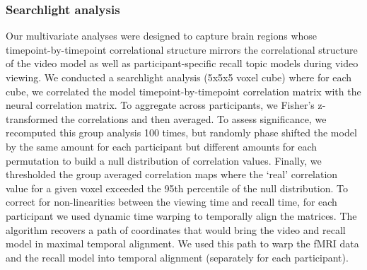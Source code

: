 \documentclass{article}
\begin{document}
\subsubsection*{Searchlight analysis}
Our multivariate analyses were designed to capture brain regions whose timepoint-by-timepoint correlational structure mirrors the correlational structure of the video model as well as participant-specific recall topic models during video viewing. We conducted a searchlight analysis (5x5x5 voxel cube) where for each cube, we correlated the model timepoint-by-timepoint correlation matrix with the neural correlation matrix. To aggregate across participants, we Fisher's z-transformed the correlations and then averaged.  To assess significance, we recomputed this group analysis 100 times, but randomly phase shifted the model by the same amount for each participant but different amounts for each permutation to build a null distribution of correlation values. Finally, we thresholded the group averaged correlation maps where the `real' correlation value for a given voxel exceeded the 95th percentile of the null distribution. To correct for non-linearities between the viewing time and recall time, for each participant we used dynamic time warping to temporally align the matrices. The algorithm recovers a path of coordinates that would bring the video and recall model in maximal temporal alignment. We used this path to warp the fMRI data and the recall model into temporal alignment (separately for each participant).



\end{document}
